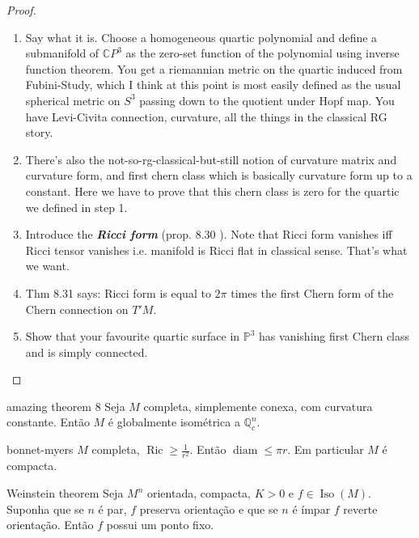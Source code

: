 \begin{proof}
\begin{enumerate}[label=\textbf{Step \arabic*}]
\item Say what it is. Choose a homogeneous quartic polynomial and define a submanifold of \(\mathbb{C}P^{3}\) as the zero-set function of the polynomial using inverse function theorem. You get a riemannian metric on the quartic induced from Fubini-Study, which I think at this point is most easily defined as the usual spherical metric on \(S^3\) passing down to the quotient under Hopf map. You have Levi-Civita connection, curvature, all the things in the classical RG story.
\item There's also the not-so-rg-classical-but-still notion of curvature matrix and curvature form, and first chern class which is basically curvature form up to a constant. Here we have to prove that this chern class is zero for the quartic we defined in step 1.
\item Introduce the \textit{\textbf{Ricci form}} (prop. 8.30 \cite{lec}). Note that Ricci form vanishes iff Ricci tensor vanishes i.e. manifold is Ricci flat in classical sense. That's what we want.
\item Thm 8.31 \cite{lec} says: Ricci form is equal to \(2\pi\) times the first Chern form of the Chern connection on \(T'M\).
\item Show that your favourite quartic surface in \(\mathbb{P}^3\) has vanishing first Chern class and is simply connected.
\end{enumerate}
\end{proof}

\begin{thing6}{amazing theorem 8}\leavevmode
Seja \(M\) completa, simplemente conexa, com curvatura constante. Então \(M\) é globalmente isométrica a \(\mathbb{Q}^n_c\).
\end{thing6}

\begin{thing6}{bonnet-myers}\leavevmode
	\(M\) completa, \(\operatorname{Ric} \geq \frac{1}{r^2}\). Então \(\operatorname{diam}\leq \pi r\). Em particular \(M\) é compacta.
\end{thing6}

\begin{thing6}{Weinstein theorem}\label{thm:Weinstein theorem}\leavevmode
Seja \(M^n\) orientada, compacta, \(K>0\) e \(f \in \operatorname{Iso}(M)\).  Suponha que se \(n\) é par, \(f\) preserva orientação e que se \(n\) é ímpar \(f\) reverte orientação. Então \(f\) possui um ponto fixo.
\end{thing6}

